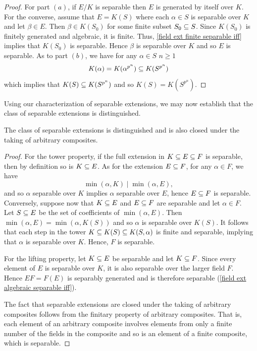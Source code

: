 \begin{proof}
For part $(a)$, if $E/K$ is separable then $E$ is generated by itself over $K$. For the converse, assume that $E=K(S)$ where each $\alpha\in S$ is separable over $K$ and let $\beta\in E$. Then $\beta\in K(S_0)$ for some finite subset $S_0\subseteq S$. Since $K(S_0)$ is finitely generated and algebraic, it is finite. Thus, \cref{field ext finite separable iff} implies that $K(S_0)$ is separable. Hence $\beta$ is separable over $K$ and so $E$ is separable. As to part $(b)$, we have for any $\alpha\in S$ $n\geq 1$
\[K(\alpha)=K(\alpha^{p^n})\subseteq K(S^{p^n})\]
which implies that $K(S)\subseteq K(S^{p^n})$ and so $K(S)=K(S^{p^n})$. 
\end{proof}
Using our characterization of separable extensions, we may now establish that the class of separable extensions is distinguished.
\begin{proposition}
The class of separable extensions is distinguished and is also closed under the taking of arbitrary composites.
\end{proposition}
\begin{proof}
For the tower property, if the full extension in $K\subseteq E\subseteq F$ is separable, then by definition so is $K\subseteq E$. As for the extension $E\subseteq F$, for any $\alpha\in F$, we have
\[\min(\alpha,K)\mid\min(\alpha,E),\]
and so $\alpha$ separable over $K$ implies $\alpha$ separable over $E$, hence $E\subseteq F$ is separable. Conversely, suppose now that $K\subseteq E$ and $E\subseteq F$ are separable and let $\alpha\in F$. Let $S\subseteq E$ be the set of coefficients of $\min(\alpha,E)$. Then $\min(\alpha,E)=\min(\alpha,K(S))$ and so $\alpha$ is separable over $K(S)$. It follows that each step in the
tower  $K\subseteq K(S)\subseteq K(S,\alpha)$ is finite and separable, implying that $\alpha$ is separable over $K$. Hence, $F$ is separable.\par
For the lifting property, let $K\subseteq E$ be separable and let $K\subseteq F$. Since every element of $E$ is separable over $K$, it is also separable over the larger field $F$. Hence $EF=F(E)$ is separably generated and is therefore separable (\cref{field ext algebraic separable iff}).\par
The fact that separable extensions are closed under the taking of arbitrary
composites follows from the finitary property of arbitrary composites. That is, each element of an arbitrary composite involves elements from only a finite number of the fields in the composite and so is an element of a finite composite, which is separable.
\end{proof}

